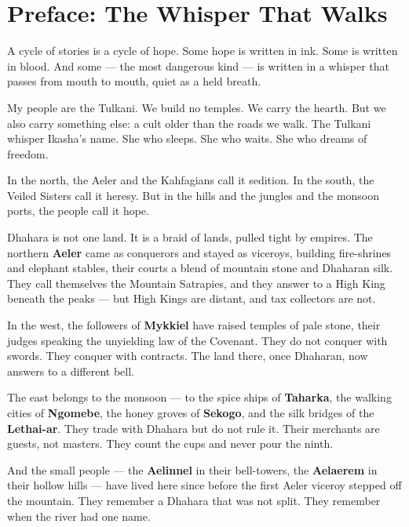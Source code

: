 \documentclass[10pt,twoside]{book}
\begin{document}




\tableofcontents

\chapter*{Preface: The Whisper That Walks}

A cycle of stories is a cycle of hope. Some hope is written in ink. Some is written in blood. And some --- the most dangerous kind --- is written in a whisper that passes from mouth to mouth, quiet as a held breath.

My people are the Tulkani. We build no temples. We carry the hearth. But we also carry something else: a cult older than the roads we walk. The Tulkani whisper Ikasha's name. She who sleeps. She who waits. She who dreams of freedom.

In the north, the Aeler and the Kahfagians call it sedition. In the south, the Veiled Sisters call it heresy. But in the hills and the jungles and the monsoon ports, the people call it hope.

Dhahara is not one land. It is a braid of lands, pulled tight by empires. The northern \textbf{Aeler} came as conquerors and stayed as viceroys, building fire-shrines and elephant stables, their courts a blend of mountain stone and Dhaharan silk. They call themselves the Mountain Satrapies, and they answer to a High King beneath the peaks --- but High Kings are distant, and tax collectors are not.

In the west, the followers of \textbf{Mykkiel} have raised temples of pale stone, their judges speaking the unyielding law of the Covenant. They do not conquer with swords. They conquer with contracts. The land there, once Dhaharan, now answers to a different bell.

The east belongs to the monsoon --- to the spice ships of \textbf{Taharka}, the walking cities of \textbf{Ngomebe}, the honey groves of \textbf{Sekogo}, and the silk bridges of the \textbf{Lethai-ar}. They trade with Dhahara but do not rule it. Their merchants are guests, not masters. They count the cups and never pour the ninth.

And the small people --- the \textbf{Aelinnel} in their bell-towers, the \textbf{Aelaerem} in their hollow hills --- have lived here since before the first Aeler viceroy stepped off the mountain. They remember a Dhahara that was not split. They remember when the river had one name.
\end{document}
